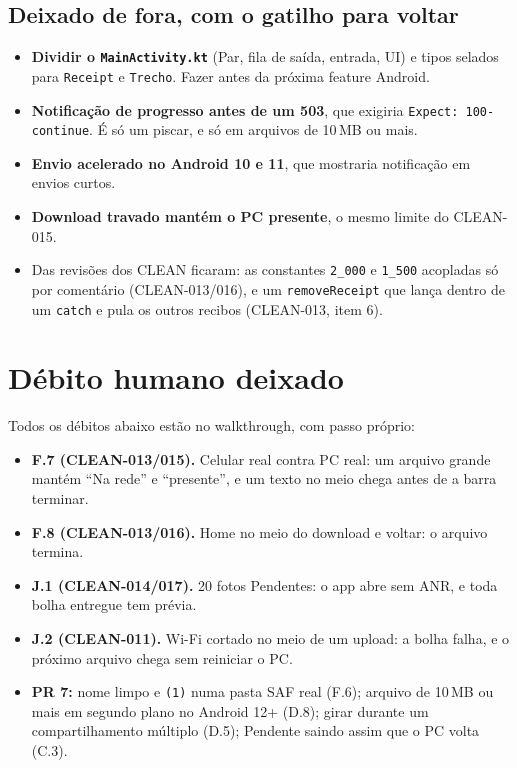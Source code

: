 \documentclass[11pt,a4paper]{article}
\begin{document}
\subsection*{Deixado de fora, com o gatilho para voltar}

\begin{itemize}
  \item \textbf{Dividir o \texttt{MainActivity.kt}} (Par, fila de saída,
        entrada, UI) e tipos selados para \texttt{Receipt} e
        \texttt{Trecho}. Fazer antes da próxima feature Android.
  \item \textbf{Notificação de progresso antes de um 503}, que exigiria
        \texttt{Expect: 100-continue}. É só um piscar, e só em arquivos de
        10\,MB ou mais.
  \item \textbf{Envio acelerado no Android 10 e 11}, que mostraria
        notificação em envios curtos.
  \item \textbf{Download travado mantém o PC presente}, o mesmo limite do
        CLEAN-015.
  \item Das revisões dos CLEAN ficaram: as constantes \texttt{2\_000} e
        \texttt{1\_500} acopladas só por comentário (CLEAN-013/016), e um
        \texttt{removeReceipt} que lança dentro de um \texttt{catch} e pula
        os outros recibos (CLEAN-013, item 6).
\end{itemize}

\section{Débito humano deixado}

Todos os débitos abaixo estão no walkthrough, com passo próprio:
\begin{itemize}
  \item \textbf{F.7 (CLEAN-013/015).} Celular real contra PC real: um
        arquivo grande mantém ``Na rede'' e ``presente'', e um texto no meio
        chega antes de a barra terminar.
  \item \textbf{F.8 (CLEAN-013/016).} Home no meio do download e voltar: o
        arquivo termina.
  \item \textbf{J.1 (CLEAN-014/017).} 20 fotos Pendentes: o app abre sem ANR,
        e toda bolha entregue tem prévia.
  \item \textbf{J.2 (CLEAN-011).} Wi-Fi cortado no meio de um upload: a bolha
        falha, e o próximo arquivo chega sem reiniciar o PC.
  \item \textbf{PR 7:} nome limpo e \texttt{(1)} numa pasta SAF real (F.6);
        arquivo de 10\,MB ou mais em segundo plano no Android 12+ (D.8);
        girar durante um compartilhamento múltiplo (D.5); Pendente saindo
        assim que o PC volta (C.3).
\end{itemize}
\end{document}
